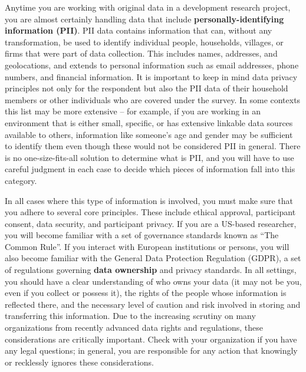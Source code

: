 Anytime you are working with original data in a development research project,
you are almost certainly handling data that include \textbf{personally-identifying
	information (PII)}.
PII data contains information that can, without any transformation, be used to identify
individual people, households, villages, or firms that were part of data collection.
This includes names, addresses, and geolocations, and extends to personal information
such as email addresses, phone numbers, and financial information.
It is important to keep in mind data privacy principles not only for the  respondent 
but also the PII data of their household members or other individuals who are covered under the survey.
In some contexts this list may be more extensive --
for example, if you are working in an environment that is either small, specific,
or has extensive linkable data sources available to others,
information like someone's age and gender may be sufficient to identify them
even though these would not be considered PII in general.
There is no one-size-fits-all solution to determine what is PII, and you will have to use careful judgment in each case
to decide which pieces of information fall into this category.

In all cases where this type of information is involved,
you must make sure that you adhere to several core principles.
These include ethical approval, participant consent, data security, and participant privacy.
If you are a US-based researcher, you will become familiar
with a set of governance standards known as ``The Common Rule''.
If you interact with European institutions or persons,
you will also become familiar with the General Data Protection Regulation (GDPR),
a set of regulations governing \textbf{data ownership} and privacy standards.
In all settings, you should have a clear understanding of
who owns your data (it may not be you, even if you collect or possess it),
the rights of the people whose information is reflected there,
and the necessary level of caution and risk involved in
storing and transferring this information.
Due to the increasing scrutiny on many organizations
from recently advanced data rights and regulations,
these considerations are critically important.
Check with your organization if you have any legal questions;
in general, you are responsible for any action that
knowingly or recklessly ignores these considerations.

